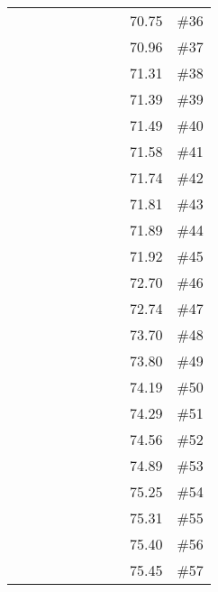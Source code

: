 \begin{longtable}{|c|c|c|c|c|c|c|c|c|c|}
 \x    & \x    & \x    & \x    & \x    & \x    &       & \x    & 70.75 & \#36 \\
 \x    & \x    & \x    &       & \x    & \x    &       & \x\m  & 70.96 & \#37 \\
 \x    & \x    & \x    & \x    &       &       &       &       & 71.31 & \#38 \\
 \x    & \x    &       & \x    & \x\m  & \x\m  &       &       & 71.39 & \#39 \\
 \x    & \x    & \x    &       & \x    & \x    &       &       & 71.49 & \#40 \\
 \x    & \x    & \x    & \x    &       &       &       &       & 71.58 & \#41 \\
 \x    & \x    & \x    & \x    &       & \x    &       & \x\m  & 71.74 & \#42 \\
 \x    & \x    & \x    &       & \x\m  &       & \x\m  &       & 71.81 & \#43 \\
 \x    & \x    & \x    &       & \x\m  & \x\m  &       & \x\m  & 71.89 & \#44 \\
 \x    & \x    & \x    & \x    & \x\m  & \x    &       & \x    & 71.92 & \#45 \\
 \x    & \x    & \x    &       & \x\m  &       &       & \x\m  & 72.70 & \#46 \\
 \x    & \x    & \x    &       & \x\m  & \x    &       & \x    & 72.74 & \#47 \\
 \x    & \x    & \x    & \x    & \x\m  &       &       &       & 73.70 & \#48 \\
 \x    & \x    & \x    & \x    &       & \x    & \x\m  &       & 73.80 & \#49 \\
 \x    & \x    & \x    & \x    &       & \x\m  & \x\m  &       & 74.19 & \#50 \\
 \x    & \x    & \x    & \x    & \x    &       & \x\m  &       & 74.29 & \#51 \\
 \x    & \x    & \x    &       & \x\m  & \x    &       &       & 74.56 & \#52 \\
 \x    & \x    & \x    &       & \x    & \x\m  & \x\m  &       & 74.89 & \#53 \\
 \x    & \x    & \x    &       & \x\m  & \x    &       & \x\m  & 75.25 & \#54 \\
 \x    & \x    & \x    & \x    &       & \x\m  &       & \x\m  & 75.31 & \#55 \\
 \x    & \x    & \x    & \x    & \x    & \x    & \x\m  &       & 75.40 & \#56 \\
 \x    & \x    & \x    & \x    & \x    & \x\m  &       &       & 75.45 & \#57 \\

\end{longtable}

